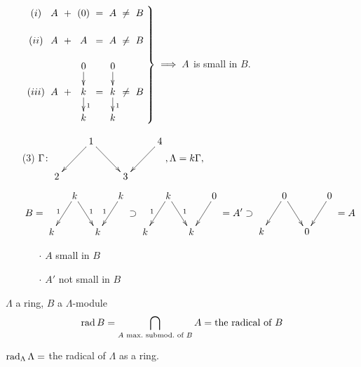 \begin{exam}
\begin{enumerate}
$\left.\begin{matrix}
\xymatrix@C-2pc@R-1pc{
(i) & A &+&(0)& =& A &\neq& B\\
(ii) & A&+&A&=&A & \neq & B\\
&&& 0\ar@{->}[d] && 0\ar@{->}[d] &&\\
(iii) & A &+& k\ar@{->}[d]^1 &=& k\ar@{->}[d]^1 &\neq &B\\
&&& k && k &&
}
\end{matrix}\right\rbrace \implies A$ is small in $B$.
\\
\item[(3)] $\G \colon \vcenter{\xymatrix
{& 1\ar[dr]\ar[dl] && 4\ar[dl]\\
2 && 3 &}}, \Lambda = k\G,$ 
$$B = 
\vcenter{\xymatrix@C-1pc
{& k\ar[dr]^1\ar[dl]_1 && k\ar[dl]_1\\
k && k &}} 
\supset 
\vcenter{\xymatrix@C-1pc
{& k\ar[dr]^1\ar[dl]_1 && 0\ar[dl]\\
k && k &}} 
= A' \supset 
\vcenter{\xymatrix@C-1pc
{& 0\ar[dr]\ar[dl] && 0\ar[dl]\\
k && 0 &}}
=A$$
\begin{exer}
\begin{enumerate}
\item[]
\item[$\cdot$]$A$ small in $B$
\item[$\cdot$]$A'$ not small in $B$
\end{enumerate}
\end{exer}
\end{enumerate}
\end{exam}

\begin{defin}
$\Lambda$ a ring, $B$ a $\Lambda$-module
$$\rad B = \bigcap_{A \text{\ max.\ submod.\ of }B} A = \text{the radical of }B$$
\begin{note}
$\operatorname{rad}\nolimits_\Lambda \Lambda = $ the radical of $\Lambda$ as a ring.
\end{note}
\end{defin}

